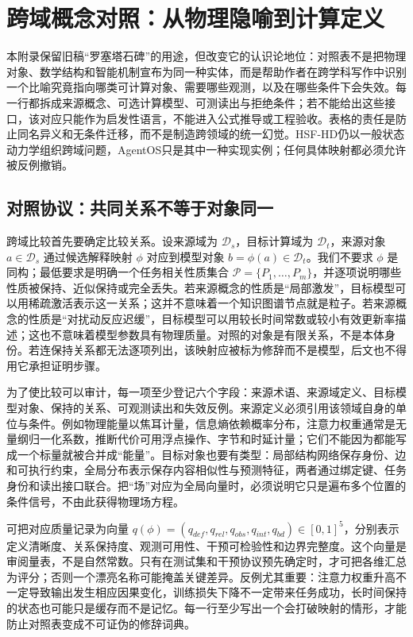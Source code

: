 \chapter{跨域概念对照：从物理隐喻到计算定义}
\label{sec:section_8308}

本附录保留旧稿“罗塞塔石碑”的用途，但改变它的认识论地位：对照表不是把物理对象、数学结构和智能机制宣布为同一种实体，而是帮助作者在跨学科写作中识别一个比喻究竟指向哪类可计算对象、需要哪些观测，以及在哪些条件下会失效。每一行都拆成来源概念、可选计算模型、可测读出与拒绝条件；若不能给出这些接口，该对应只能作为启发性语言，不能进入公式推导或工程验收。表格的责任是防止同名异义和无条件迁移，而不是制造跨领域的统一幻觉。HSF-HD仍以一般状态动力学组织跨域问题，AgentOS只是其中一种实现实例；任何具体映射都必须允许被反例撤销。

\section{对照协议：共同关系不等于对象同一}

跨域比较首先要确定比较关系。设来源域为 $\mathcal D_s$，目标计算域为 $\mathcal D_t$，来源对象 $a\in\mathcal D_s$ 通过候选解释映射 $\phi$ 对应到模型对象 $b=\phi(a)\in\mathcal D_t$。我们不要求 $\phi$ 是同构；最低要求是明确一个任务相关性质集合 $\mathcal P=\{P_1,\ldots,P_m\}$，并逐项说明哪些性质被保持、近似保持或完全丢失。若来源概念的性质是“局部激发”，目标模型可以用稀疏激活表示这一关系；这并不意味着一个知识图谱节点就是粒子。若来源概念的性质是“对扰动反应迟缓”，目标模型可以用较长时间常数或较小有效更新率描述；这也不意味着模型参数具有物理质量。对照的对象是有限关系，不是本体身份。若连保持关系都无法逐项列出，该映射应被标为修辞而不是模型，后文也不得用它承担证明步骤。

为了使比较可以审计，每一项至少登记六个字段：来源术语、来源域定义、目标模型对象、保持的关系、可观测读出和失效反例。来源定义必须引用该领域自身的单位与条件。例如物理能量以焦耳计量，信息熵依赖概率分布，注意力权重通常是无量纲归一化系数，推断代价可用浮点操作、字节和时延计量；它们不能因为都能写成一个标量就被合并成“能量”。目标对象也要有类型：局部结构网络保存身份、边和可执行约束，全局分布表示保存内容相似性与预测特征，两者通过绑定键、任务身份和读出接口联合。把“场”对应为全局向量时，必须说明它只是遍布多个位置的条件信号，不由此获得物理场方程。

可把对应质量记录为向量 $q(\phi)=(q_{def},q_{rel},q_{obs},q_{int},q_{bd})\in[0,1]^5$，分别表示定义清晰度、关系保持度、观测可用性、干预可检验性和边界完整度。这个向量是审阅量表，不是自然常数。只有在测试集和干预协议预先确定时，才可把各维汇总为评分；否则一个漂亮名称可能掩盖关键差异。反例尤其重要：注意力权重升高不一定导致输出发生相应因果变化，训练损失下降不一定带来任务成功，长时间保持的状态也可能只是缓存而不是记忆。每一行至少写出一个会打破映射的情形，才能防止对照表变成不可证伪的修辞词典。

